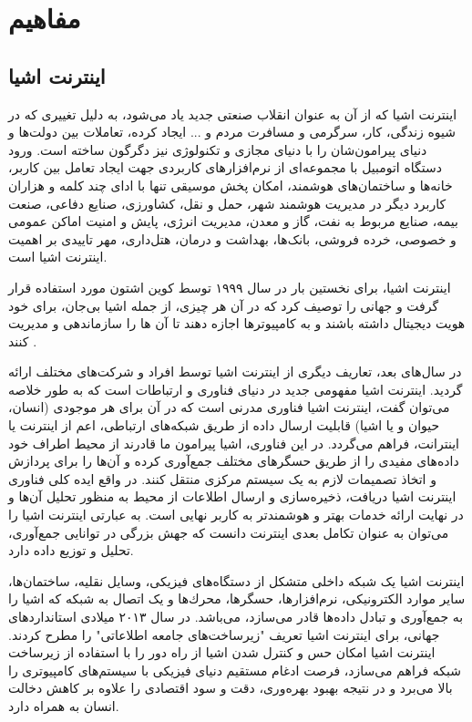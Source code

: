 \chapter{مفاهیم}
\section{اینترنت اشیا}
اینترنت اشیا که از آن به عنوان انقلاب صنعتی جدید یاد می‌شود، به دلیل تغییری که در شیوه زندگی، کار، سرگرمی و مسافرت مردم و ... ایجاد کرده، تعاملات بین دولت‌ها و دنیای پیرامون‌شان را با دنیای مجازی و تكنولوژی نیز دگرگون ساخته است. ورود دستگاه اتومبیل با مجموعه‌ای از نرم‌افزارهای کاربردی جهت ایجاد تعامل بین کاربر، خانه‌ها و ساختمان‌های هوشمند، امكان پخش موسیقی تنها با ادای چند کلمه و هزاران کاربرد دیگر در مدیریت هوشمند شهر، حمل و نقل، کشاورزی، صنایع دفاعی،
صنعت بیمه، صنایع مربوط به نفت، گاز و معدن، مدیریت انرژی، پایش و امنیت اماکن عمومی و
خصوصی، خرده فروشی، بانک‌ها، بهداشت و درمان، هتل‌داری، مهر تاییدی بر اهمیت اینترنت اشیا است.


اینترنت اشیا، برای نخستین بار در سال ۱۹۹۹ توسط کوین اشتون مورد استفاده قرار گرفت و جهانی را توصیف کرد که در آن هر چیزی، از جمله اشیا بی‌جان، برای خود هویت دیجیتال داشته باشند و به کامپیوترها اجازه دهند تا آن ها را سازماندهی و مدیریت کنند \cite{Madakam2015}.


در سال‌های بعد، تعاریف دیگری از اینترنت اشیا توسط افراد و شرکت‌های مختلف ارائه گردید. اینترنت اشیا مفهومی جدید در دنیای فناوری و ارتباطات است که به طور خلاصه می‌توان گفت، اینترنت اشیا فناوری مدرنی است که در آن برای هر موجودی (انسان، حیوان و یا اشیا) قابلیت ارسال داده از طریق شبكه‌های ارتباطی، اعم از اینترنت یا اینترانت، فراهم می‌گردد. در این فناوری، اشیا پیرامون ما قادرند از محیط اطراف خود داده‌های مفیدی را از طریق حسگرهای مختلف جمع‌آوری کرده و آن‌ها را برای پردازش و اتخاذ تصمیمات لازم به یک سیستم مرکزی منتقل کنند. در واقع ایده کلی فناوری اینترنت اشیا دریافت، ذخیره‌سازی و ارسال اطلاعات از محیط به منظور تحلیل آن‌ها و در نهایت ارائه خدمات بهتر و هوشمندتر به کاربر نهایی است. به عبارتی اینترنت اشیا را می‌توان به عنوان تكامل بعدی اینترنت دانست که جهش بزرگی در توانایی جمع‌آوری، تحلیل و توزیع داده دارد.


اینترنت اشیا یک شبكه داخلی متشکل از دستگاه‌های فیزیکی، وسایل نقلیه، ساختمان‌ها، سایر موارد الكترونیكی، نرم‌افزارها، حسگرها، محرك‌ها و یک اتصال به شبكه که اشیا را به جمع‌آوری و تبادل
داده‌ها قادر می‌سازد، می‌باشد. در سال ۲۰۱۳ میلادی استانداردهای جهانی، برای اینترنت اشیا تعریف "زیرساخت‌های جامعه اطلاعاتی" را مطرح کردند. اینترنت اشیا امكان حس و کنترل شدن اشیا از راه دور را با استفاده از زیرساخت شبكه فراهم می‌سازد، فرصت ادغام مستقیم دنیای فیزیكی با سیستم‌های کامپیوتری را بالا می‌برد و در نتیجه بهبود بهره‌وری، دقت و سود اقتصادی را علاوه بر کاهش دخالت انسان به همراه دارد.
